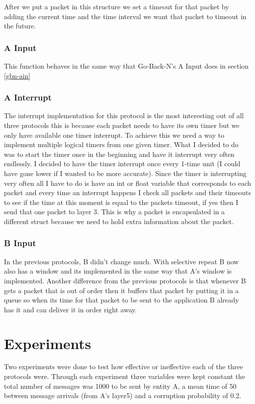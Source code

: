 \documentclass[10pt, a4paper]{article}
\begin{document}
        After we put a packet in this structure we set a timeout for that packet by adding the current time and the time interval we want that packet to timeout in the future.
    \subsubsection{A Input}
        This function behaves in the same way that Go-Back-N's A Input does in section \ref{gbn-ain}
    \subsubsection{A Interrupt\label{sr-aint}}
        The interrupt implementation for this protocol is the most interesting out of all three protocols this is because each packet needs to have its own timer but we only have available one timer interrupt. To achieve this we need a way to implement multiple logical timers from one given timer. What I decided to do was to start the timer once in the beginning and have it interrupt very often endlessly. I decided to have the timer interrupt once every 1-time unit (I could have gone lower if I wanted to be more accurate). Since the timer is interrupting very often all I have to do is have an int or float variable that corresponds to each packet and every time an interrupt happens I check all packets and their timeouts to see if the time at this moment is equal to the packets timeout, if yes then I send that one packet to layer 3. This is why a packet is encapsulated in a different struct because we need to hold extra information about the packet.    
    \subsubsection{B Input\label{sr-bin}}
        In the previous protocols, B didn't change much. With selective repeat B now also has a window and its implemented in the same way that A's window is implemented. Another difference from the previous protocols is that whenever B gets a packet that is out of order then it buffers that packet by putting it in a queue so when its time for that packet to be sent to the application B already has it and can deliver it in order right away.
    
\section{Experiments}
    Two experiments were done to test how effective or ineffective each of the three protocols were. Through each experiment three variables were kept constant the total number of messages was 1000 to be sent by entity A, a mean time of 50 between message arrivals (from A’s layer5) and a corruption probability of 0.2. 
    
\end{document}
